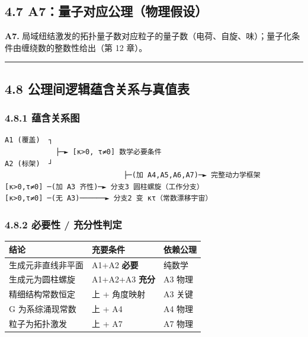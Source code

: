 \subsection{4.7
A7：量子对应公理（物理假设）}\label{a7ux91cfux5b50ux5bf9ux5e94ux516cux7406ux7269ux7406ux5047ux8bbe}

\textbf{A7.}
局域纽结激发的拓扑量子数对应粒子的量子数（电荷、自旋、味）；量子化条件由缠绕数的整数性给出（第
12 章）。

\begin{center}\rule{0.5\linewidth}{0.5pt}\end{center}

\subsection{4.8
公理间逻辑蕴含关系与真值表}\label{ux516cux7406ux95f4ux903bux8f91ux8574ux542bux5173ux7cfbux4e0eux771fux503cux8868}

\subsubsection{4.8.1 蕴含关系图}\label{ux8574ux542bux5173ux7cfbux56fe}

\begin{verbatim}
A1 (覆盖)  ┐
            ├─► [κ>0, τ≠0] 数学必要条件
A2 (标架)  ┘
                            ├─(加 A4,A5,A6,A7)─► 完整动力学框架
[κ>0,τ≠0] ─(加 A3 齐性)─► 分支3 圆柱螺旋（工作分支）
[κ>0,τ≠0] ─(无 A3)──────► 分支2 变 κτ（常数漂移宇宙）
\end{verbatim}

\subsubsection{4.8.2 必要性 /
充分性判定}\label{ux5fc5ux8981ux6027-ux5145ux5206ux6027ux5224ux5b9a}

\begin{longtable}[]{@{}lll@{}}
\toprule\noalign{}
结论 & 充要条件 & 依赖公理 \\
\midrule\noalign{}
\endhead
\bottomrule\noalign{}
\endlastfoot
生成元非直线非平面 & A1+A2 \textbf{必要} & 纯数学 \\
生成元为圆柱螺旋 & A1+A2+A3 \textbf{充分} & A3 物理 \\
精细结构常数恒定 & 上 + 角度映射 & A3 关键 \\
G 为系综涌现常数 & 上 + A4 & A4 物理 \\
粒子为拓扑激发 & 上 + A7 & A7 物理 \\
\end{longtable}

